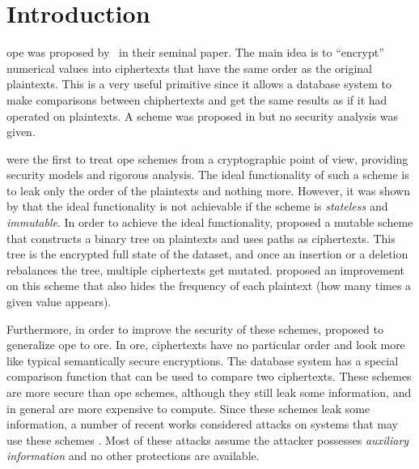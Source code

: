 \section{Introduction}

	\acrfull{ope} was proposed by~\textcite{ope-original} in their seminal paper.
	The main idea is to ``encrypt'' numerical values into ciphertexts that have the same order as the original plaintexts.
	This is a very useful primitive since it allows a database system to make comparisons between chiphertexts and get the same results as if it had operated on plaintexts.
	A scheme was proposed in \cite{ope-original} but no security analysis was given.

	\textcite{bclo-ope} were the first to treat \acrshort{ope} schemes from a cryptographic point of view, providing security models and rigorous analysis.
	The ideal functionality of such a scheme is to leak only the order of the plaintexts and nothing more.
	However, it was shown by \textcite{bclo-ope} that the ideal functionality is not achievable if the scheme is \emph{stateless} and \emph{immutable}.
	In order to achieve the ideal functionality, \textcite{ope-ideal-security-protocol} proposed a mutable scheme that constructs a binary tree on plaintexts and uses paths as ciphertexts.
	This tree is the encrypted full state of the dataset, and once an insertion or a deletion rebalances the tree, multiple ciphertexts get mutated.
	\textcite{fh-ope} proposed an improvement on this scheme that also hides the frequency of each plaintext (how many times a given value appears).

	Furthermore, in order to improve the security of these schemes, \textcite{ore-original} proposed to generalize \acrshort{ope} to \acrfull{ore}.
	In \acrshort{ore}, ciphertexts have no particular order and look more like typical semantically secure encryptions.
	The database system has a special comparison function that can be used to compare two ciphertexts.
	These schemes are more secure than \acrshort{ope} schemes, although they still leak some information, and in general are more expensive to compute.
	Since these schemes leak some information, a number of recent works considered attacks on systems that may use these schemes \cite{access-pattern-disclosure, inference-attack-islam-14, inference-attacks-naveed-15, grubbs-attacks, generic-attacks-kellaris, leakage-abuse-attacks-cash-15, attacks-what-else-revealed, attacks-improved-reconstruction, attacks-tao-of-inference, attacks-ore-injection}.
	Most of these attacks assume the attacker possesses \emph{auxiliary information} and no other protections are available.

